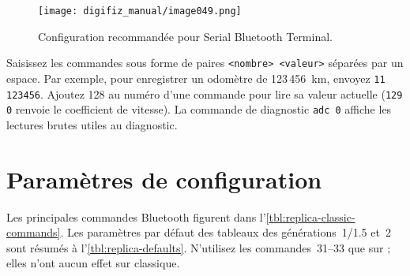 \begin{figure}[htbp]
    \centering
    \texttt{[image: digifiz\_manual/image049.png]}
    \caption{Configuration recommandée pour Serial Bluetooth Terminal.}
    \label{fig:sbt-settings}
\end{figure}

Saisissez les commandes sous forme de paires \verb|<nombre> <valeur>| séparées par un espace. Par exemple, pour enregistrer un odomètre de 123\,456~km, envoyez \verb|11 123456|. Ajoutez 128 au numéro d'une commande pour lire sa valeur actuelle (\verb|129 0| renvoie le coefficient de vitesse). La commande de diagnostic \verb|adc 0| affiche les lectures brutes utiles au diagnostic.

\section{Paramètres de configuration}
Les principales commandes Bluetooth figurent dans l'\autoref{tbl:replica-classic-commands}. Les paramètres par défaut des tableaux des générations~1/1.5 et~2 sont résumés à l'\autoref{tbl:replica-defaults}. N'utilisez les commandes~31--33 que sur \ReplicaNextShort{} ; elles n'ont aucun effet sur \ReplicaGenOneShort{} classique.

